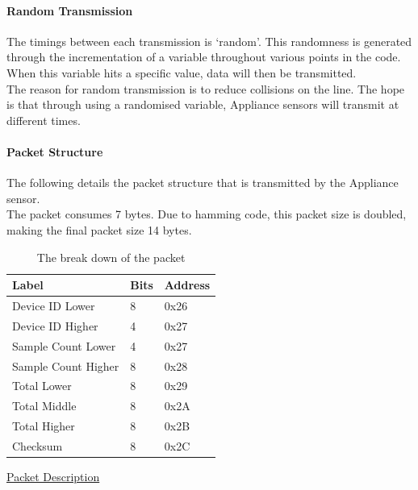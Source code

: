 \documentclass[draft,preprint,12pt,3p]{elsarticle}
\begin{document}
\paragraph{Random Transmission}
The timings between each transmission is `random'. This randomness is generated through the incrementation of a variable throughout various points in the code. When this variable hits a specific value, data will then be transmitted. \\
The reason for random transmission is to reduce collisions on the line. The hope is that through using a randomised variable, Appliance sensors will transmit at different times.

\paragraph{Packet Structure}
The following details the packet structure that is transmitted by the Appliance sensor.\\
The packet consumes 7 bytes. Due to hamming code, this packet size is doubled, making the final packet size 14 bytes.\\[5pt]
\begin{table}[H]
\centering
\resizebox{8cm}{!} {%
    \centering
    \begin{tabular}{| l | l | p{2cm} |}
    \hline
    Label & Bits &  Address \\ \hline
    Device ID Lower & 8 & 0x26\\ \hline
    Device ID Higher & 4 & 0x27\\ \hline
    Sample Count Lower & 4 & 0x27\\ \hline
    Sample Count Higher & 8 & 0x28\\ \hline
    Total Lower & 8 & 0x29\\ \hline
    Total Middle & 8 & 0x2A\\ \hline
    Total Higher & 8 & 0x2B\\ \hline
    Checksum & 8 & 0x2C\\ \hline
    \end{tabular}
}
\caption{The break down of the packet}
\label{tab:packet}
\end{table}
\underline{Packet Description}
\end{document}
